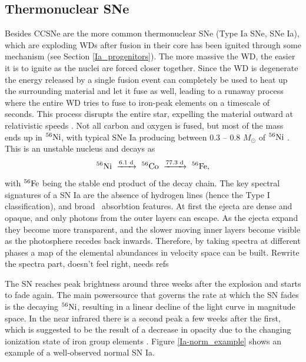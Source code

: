 \documentclass[a4paper,oneside,12pt, class=Latex/Classes/PhDthesisPSnPDF, crop=false]{standalone}
\begin{document}
\subsection{Thermonuclear SNe}
\label{SNIa}
Besides CCSNe are the more common thermonuclear SNe (Type Ia SNe, SNe Ia), which are exploding WDs after fusion in their core has been ignited through some mechanism (see Section \ref{Ia_progenitors}). The more massive the WD, the easier it is to ignite as the nuclei are forced closer together. Since the WD is degenerate the energy released by a single fusion event can completely be used to heat up the surrounding material and let it fuse as well, leading to a runaway process where the entire WD tries to fuse to iron-peak elements on a timescale of seconds. This process disrupts the entire star, expelling the material outward at relativistic speeds \citep{Ia_thermonuclear}. Not all carbon and oxygen is fused, but most of the mass ends up in $^{56}\text{Ni}$, with typical SNe Ia producing between 0.3 -- 0.8 $M_\odot$ of $^{56}\text{Ni}$ \citep{Ia_Ni56_yield}. This is an unstable nucleus and decays as
\begin{equation}
    \Nififtysix\ \xrightarrow{6.1\text{ d}}\ \Cofiftysix\ \xrightarrow{77.3\text{ d}}\ \Fefiftysix,
\end{equation}
with $^{56}\text{Fe}$ being the stable end product of the decay chain. The key spectral signatures of a SN Ia are the absence of hydrogen lines (hence the Type I classification), and broad \SiII\ absorbtion features. At first the ejecta are dense and opaque, and only photons from the outer layers can escape. As the ejecta expand they become more transparent, and the slower moving inner layers become visible as the photosphere recedes back inwards. Therefore, by taking spectra at different phases a map of the elemental abundances in velocity space can be built. \color{red}Rewrite the spectra part, doesn't feel right, needs refs \color{black}

The SN reaches peak brightness around three weeks after the explosion and starts to fade again. The main powersource that governs the rate at which the SN fades is the decaying $^{56}\text{Ni}$, resulting in a linear decline of the light curve in magnitude space. In the near infrared there is a second peak a few weeks after the first, which is suggested to be the result of a decrease in opacity due to the changing ionization state of iron group elements \citep{2nd_max}. Figure \ref{Ia-norm_example} shows an example of a well-observed normal SN Ia.
\end{document}
